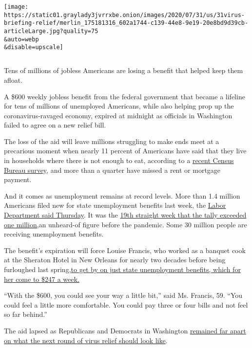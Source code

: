 \texttt{[image: https://static01.graylady3jvrrxbe.onion/images/2020/07/31/us/31virus-briefing-relief/merlin\_175181316\_602a1744-c139-44e8-9e19-20e8bd9d39cb-articleLarge.jpg?quality=75\\\&auto=webp\\\&disable=upscale]}

\subsection{}

Tens of millions of jobless Americans are losing a benefit that helped
keep them afloat.

A \$600 weekly jobless benefit from the federal government that became a
lifeline for tens of millions of unemployed Americans, while also
helping prop up the coronavirus-ravaged economy, expired at midnight as
officials in Washington failed to agree on a new relief bill.

The loss of the aid will leave millions struggling to make ends meet at
a precarious moment when nearly 11 percent of Americans have said that
they live in households where there is not enough to eat, according to a
\href{https://www.census.gov/programs-surveys/household-pulse-survey/data.html?utm_campaign=20200727mspuls1ccdtanl\&utm_medium=email\&utm_source=govdelivery}{recent
Census Bureau survey}, and more than a quarter have missed a rent or
mortgage payment.

And it comes as unemployment remains at record levels. More than 1.4
million Americans filed new for state unemployment benefits last week,
the \href{https://oui.doleta.gov/press/2020/073020.pdf}{Labor Department
said Thursday}. It was the
\href{https://www.nytimes3xbfgragh.onion/2020/07/30/business/economy/q2-gdp-coronavirus-economy.html}{19th
straight week that the tally exceeded one million,}an unheard-of figure
before the pandemic. Some 30 million people are receiving unemployment
benefits.

The benefit's expiration will force Louise Francis, who worked as a
banquet cook at the Sheraton Hotel in New Orleans for nearly two decades
before being furloughed last
spring,\href{https://www.nytimes3xbfgragh.onion/2020/07/30/business/economy/q2-gdp-coronavirus-economy.html}{to
get by on just state unemployment benefits, which for her come to \$247
a week.}

``With the \$600, you could see your way a little bit,'' said Ms.
Francis, 59. ``You could feel a little more comfortable. You could pay
three or four bills and not feel so far behind.''

The aid lapsed as Republicans and Democrats in Washington
\href{https://www.nytimes3xbfgragh.onion/2020/07/28/us/politics/coronavirus-relief-bills-house-senate.html}{remained
far apart on what the next round of virus relief should look like}.

